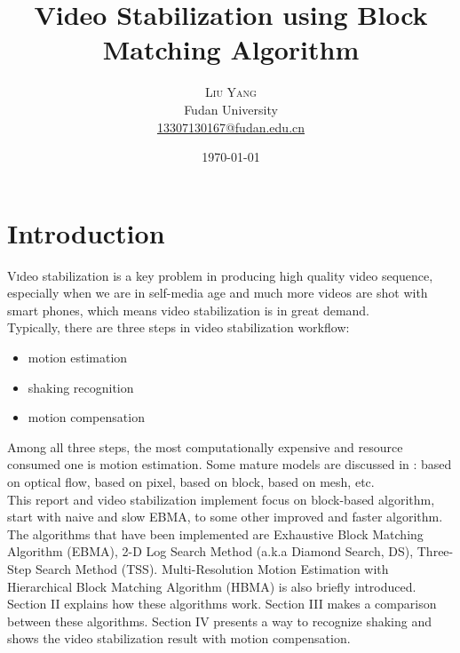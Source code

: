 \documentclass[a4paper, twocolumn]{article}
\title{Video Stabilization using Block Matching Algorithm} %
\author{%
	\textsc{Liu Yang} \\[1ex] %
	\normalsize Fudan University \\ %
	\normalsize \href{mailto:13307130167@fudan.edu.cn}{13307130167@fudan.edu.cn} %
}
\date{\today} %
\begin{document}
	
	\maketitle
	
	\section{Introduction}
	
	\lettrine[nindent=0em,lines=3]{V} ideo stabilization is a key problem in producing high quality video sequence, especially when we are in self-media age and much more videos are shot with smart phones, which means video stabilization is in great demand. \\
	Typically, there are three steps in video stabilization workflow: 
	
	\begin{itemize}
		\item motion estimation
		\item shaking recognition
		\item motion compensation
	\end{itemize}
	\noindent
	Among all three steps, the most computationally expensive and resource consumed one is motion estimation. Some mature models are discussed in \cite{vpc}: based on optical flow, based on pixel, based on block, based on mesh, etc. \\
	This report and video stabilization implement focus on block-based algorithm, start with naive and slow EBMA, to some other improved and faster algorithm. The algorithms that have been implemented are Exhaustive Block Matching Algorithm (EBMA), 2-D Log Search Method (a.k.a Diamond Search, DS), Three-Step Search Method (TSS). Multi-Resolution Motion Estimation with Hierarchical Block Matching Algorithm (HBMA) is also briefly introduced. Section II explains how these algorithms work. Section III makes a comparison between these algorithms. Section IV presents a way to recognize shaking and shows the video stabilization result with motion compensation.
	
	
\end{document}

